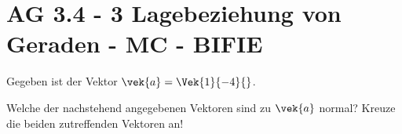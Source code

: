 \section{AG 3.4 - 3 Lagebeziehung von Geraden - MC - BIFIE}

\begin{beispiel}[AG 3.4]{1} %
Gegeben ist der Vektor $\vek{a}=\Vek{1}{-4}{}$.

Welche der nachstehend angegebenen Vektoren sind zu $\vek{a}$ normal?
Kreuze die beiden zutreffenden Vektoren an!
\end{beispiel}